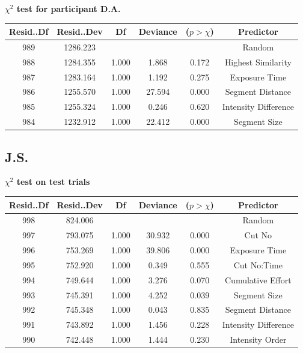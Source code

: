 \documentclass{article}
\begin{document}
\label{table:participantsAnovaDAControl}    
\textbf{$\chi^2$ test for participant D.A.}
\begin{table}[ht]
    \centering    
    \begin{tabular}{cccccc}
    \hline
    Resid..Df & Resid..Dev &    Df & Deviance & ($p > \chi$) &    Predictor \\
    \hline
      989 &   1286.223 &       &          &            &             Random \\
      988 &   1284.355 & 1.000 &    1.868 &      0.172 & Highest Similarity \\
      987 &   1283.164 & 1.000 &    1.192 &      0.275 &          Exposure Time \\
      986 &   1255.570 & 1.000 &   27.594 &      0.000 &          Segment Distance \\
      985 &   1255.324 & 1.000 &    0.246 &      0.620 &         Intensity Difference \\
      984 &   1232.912 & 1.000 &   22.412 &      0.000 &          Segment Size \\
    \hline
    \end{tabular}    
\end{table}
\clearpage


\subsection*{J.S.}
\label{table:participantsAnovaJSTest}    
\textbf{$\chi^2$ test on test trials}
\begin{table}[ht]
    \centering    
    \begin{tabular}{cccccc}
    \hline
    Resid..Df & Resid..Dev &    Df & Deviance & ($p > \chi$) &    Predictor \\
    \hline
      998 &    824.006 &       &          &            &       Random \\
      997 &    793.075 & 1.000 &   30.932 &      0.000 &       Cut No \\
      996 &    753.269 & 1.000 &   39.806 &      0.000 &    Exposure Time \\
      995 &    752.920 & 1.000 &    0.349 &      0.555 &  Cut No:Time \\
      994 &    749.644 & 1.000 &    3.276 &      0.070 & Cumulative Effort \\
      993 &    745.391 & 1.000 &    4.252 &      0.039 &    Segment Size \\
      992 &    745.348 & 1.000 &    0.043 &      0.835 &    Segment Distance \\
      991 &    743.892 & 1.000 &    1.456 &      0.228 &   Intensity Difference \\
      990 &    742.448 & 1.000 &    1.444 &      0.230 &     Intensity Order \\
    \hline
    \end{tabular}    
\end{table}
\end{document}
